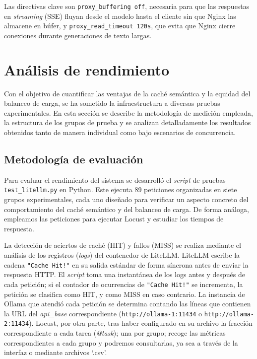 Las directivas clave son \texttt{proxy\_buffering off}, necesaria para que las respuestas en \textit{streaming} (SSE) fluyan desde el modelo hasta el cliente sin que Nginx las almacene en búfer, y \texttt{proxy\_read\_timeout 120s}, que evita que Nginx cierre conexiones durante generaciones de texto largas.

\section{Análisis de rendimiento}

Con el objetivo de cuantificar las ventajas de la caché semántica y la equidad del balanceo de carga, se ha sometido la infraestructura a diversas pruebas experimentales. En esta sección se describe la metodología de medición empleada, la estructura de los grupos de prueba y se analizan detalladamente los resultados obtenidos tanto de manera individual como bajo escenarios de concurrencia.

\subsection{Metodología de evaluación}

Para evaluar el rendimiento del sistema se desarrolló el \textit{script} de pruebas \texttt{test\_litellm.py} en Python. Este ejecuta 89 peticiones organizadas en siete grupos experimentales, cada uno diseñado para verificar un aspecto concreto del comportamiento del caché semántico y del balanceo de carga. De forma análoga, empleamos las peticiones para ejecutar Locust y estudiar los tiempos de respuesta.

La detección de aciertos de caché (HIT) y fallos (MISS) se realiza mediante el análisis de los registros (\textit{logs}) del contenedor de LiteLLM. LiteLLM escribe la cadena \texttt{"Cache Hit!"} en su salida estándar de forma síncrona antes de enviar la respuesta HTTP. El \textit{script} toma una instantánea de los logs antes y después de cada petición; si el contador de ocurrencias de \texttt{"Cache Hit!"} se incrementa, la petición se clasifica como HIT, y como MISS en caso contrario. La instancia de Ollama que atendió cada petición se determina contando las líneas que contienen la URL del \textit{api\_base} correspondiente (\texttt{http://ollama-1:11434} o \texttt{http://ollama-2:11434}). Locust, por otra parte, tras haber configurado en su archivo la fracción correspondiente a cada tarea (\emph{@task}); una por grupo; recoge las métricas correspondientes a cada grupo y podremos consultarlas, ya sea a través de la interfaz o mediante archivos `.csv'.

